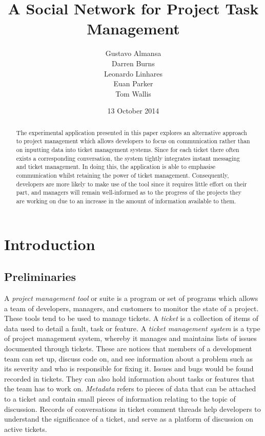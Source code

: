 \documentclass[a4paper]{l3proj}
\begin{document}
\title{A Social Network for Project Task Management}
\author{Gustavo Almansa\\
      Darren Burns \\
      Leonardo Linhares \\
      Euan Parker \\
	  Tom Wallis \\
}
\date{13 October 2014}
\maketitle
\begin{abstract}

The experimental application presented in this paper explores an alternative approach to project management which allows developers to focus on communication rather than on inputting data into ticket management systems. Since for each ticket there often exists a corresponding conversation, the system tightly integrates instant messaging and ticket management. In doing this, the application is able to emphasise  communication whilst retaining the power of ticket management. Consequently, developers are more likely to make use of the tool since it requires little effort on their part, and managers will remain well-informed as to the progress of the projects they are working on due to an increase in the amount of information available to them.

\end{abstract}
\educationalconsent
\tableofcontents
\chapter{Introduction}
\label{intro}

\section{Preliminaries}
\label{preliminaries}
A \textit{project management tool} or suite is a program or set of programs which allows a team of developers, managers, and customers to monitor the state of a project. These tools tend to be used to manage tickets. A \textit{ticket} is a collection of items of data used to detail a fault, task or feature.  A \textit{ticket management system} is a type of project management system, whereby it manages and maintains lists of issues documented through tickets. These are notices that members of a development team can set up, discuss code on, and see information about a problem such as its severity and who is responsible for fixing it. Issues and bugs would be found recorded in tickets. They can also hold information about tasks or features that the team has to work on. \textit{Metadata} refers to pieces of data that can be attached to a ticket and contain small pieces of information relating to the topic of discussion. Records of conversations in ticket comment threads help developers to understand the significance of a ticket, and serve as a platform of discussion on active tickets.
\end{document}

